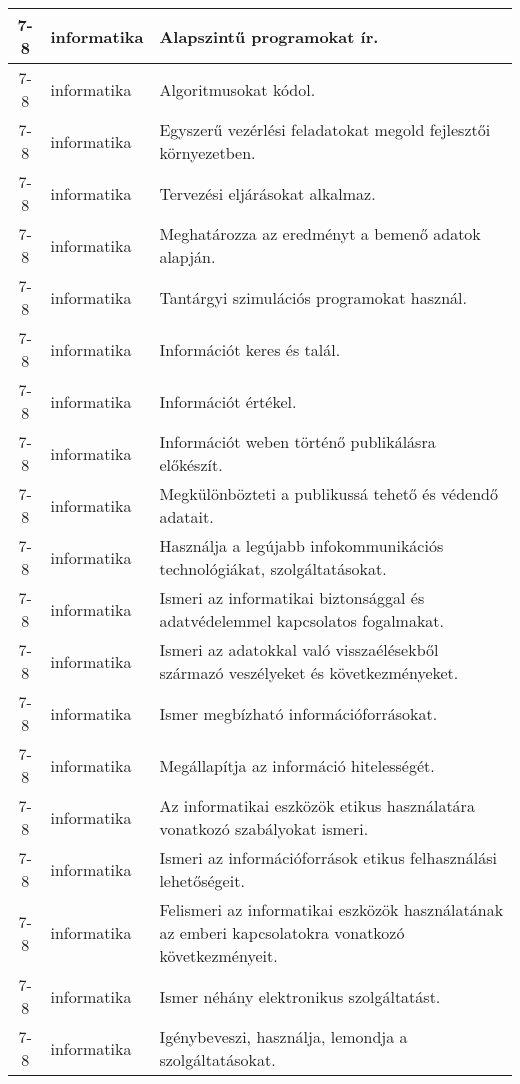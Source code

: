 \begin{small}
\begin{longtable}{c | p{2cm} |  p{11cm} }
              7-8 & informatika & Alapszintű programokat ír. \\ \hline
              7-8 & informatika & Algoritmusokat kódol. \\ \hline
              7-8 & informatika & Egyszerű vezérlési feladatokat megold fejlesztői környezetben. \\ \hline
              7-8 & informatika & Tervezési eljárásokat alkalmaz. \\ \hline
              7-8 & informatika & Meghatározza az eredményt a bemenő adatok alapján. \\ \hline
              7-8 & informatika & Tantárgyi szimulációs programokat használ. \\ \hline
              7-8 & informatika & Információt keres és talál. \\ \hline
              7-8 & informatika & Információt értékel. \\ \hline
              7-8 & informatika & Információt weben történő publikálásra előkészít. \\ \hline
              7-8 & informatika & Megkülönbözteti a publikussá tehető és védendő adatait. \\ \hline
              7-8 & informatika & Használja a legújabb infokommunikációs technológiákat, szolgáltatásokat. \\ \hline
              7-8 & informatika & Ismeri az informatikai biztonsággal és adatvédelemmel kapcsolatos fogalmakat. \\ \hline
              7-8 & informatika & Ismeri az adatokkal való visszaélésekből származó veszélyeket és következményeket. \\ \hline
              7-8 & informatika & Ismer megbízható információforrásokat. \\ \hline
              7-8 & informatika & Megállapítja az információ hitelességét. \\ \hline
              7-8 & informatika & Az informatikai eszközök etikus használatára vonatkozó szabályokat ismeri. \\ \hline
              7-8 & informatika & Ismeri az információforrások etikus felhasználási lehetőségeit. \\ \hline
              7-8 & informatika & Felismeri az informatikai eszközök használatának az emberi kapcsolatokra vonatkozó következményeit. \\ \hline
              7-8 & informatika & Ismer néhány elektronikus szolgáltatást. \\ \hline
              7-8 & informatika & Igénybeveszi, használja, lemondja a szolgáltatásokat. \\ \hline

\end{longtable}
\end{small}

